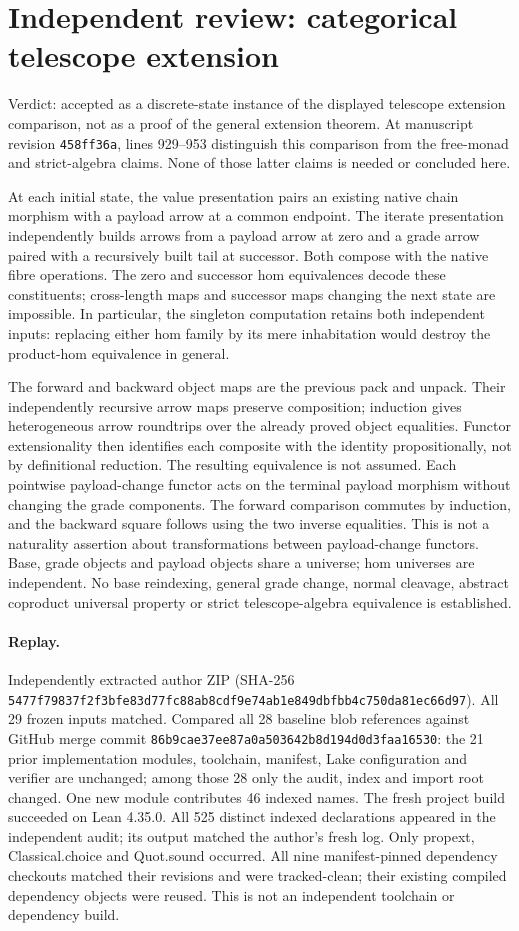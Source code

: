 \documentclass{article}
\begin{document}
\section*{Independent review: categorical telescope extension}
Verdict: accepted as a discrete-state instance of the displayed telescope extension comparison, not as a proof of the general extension theorem. At manuscript revision \texttt{458ff36a}, lines 929--953 distinguish this comparison from the free-monad and strict-algebra claims. None of those latter claims is needed or concluded here.

At each initial state, the value presentation pairs an existing native chain morphism with a payload arrow at a common endpoint. The iterate presentation independently builds arrows from a payload arrow at zero and a grade arrow paired with a recursively built tail at successor. Both compose with the native fibre operations. The zero and successor hom equivalences decode these constituents; cross-length maps and successor maps changing the next state are impossible. In particular, the singleton computation retains both independent inputs: replacing either hom family by its mere inhabitation would destroy the product-hom equivalence in general.

The forward and backward object maps are the previous pack and unpack. Their independently recursive arrow maps preserve composition; induction gives heterogeneous arrow roundtrips over the already proved object equalities. Functor extensionality then identifies each composite with the identity propositionally, not by definitional reduction. The resulting equivalence is not assumed. Each pointwise payload-change functor acts on the terminal payload morphism without changing the grade components. The forward comparison commutes by induction, and the backward square follows using the two inverse equalities. This is not a naturality assertion about transformations between payload-change functors. Base, grade objects and payload objects share a universe; hom universes are independent. No base reindexing, general grade change, normal cleavage, abstract coproduct universal property or strict telescope-algebra equivalence is established.

\paragraph{Replay.} Independently extracted author ZIP (SHA-256
\texttt{5477f79837f2f3bfe83d77fc88ab8cdf9e74ab1e849dbfbb4c750da81ec66d97}). All 29 frozen inputs matched. Compared all 28 baseline blob references against GitHub merge commit \texttt{86b9cae37ee87a0a503642b8d194d0d3faa16530}: the 21 prior implementation modules, toolchain, manifest, Lake configuration and verifier are unchanged; among those 28 only the audit, index and import root changed. One new module contributes 46 indexed names. The fresh project build succeeded on Lean 4.35.0. All 525 distinct indexed declarations appeared in the independent audit; its output matched the author's fresh log. Only propext, Classical.choice and Quot.sound occurred. All nine manifest-pinned dependency checkouts matched their revisions and were tracked-clean; their existing compiled dependency objects were reused. This is not an independent toolchain or dependency build.
\end{document}
